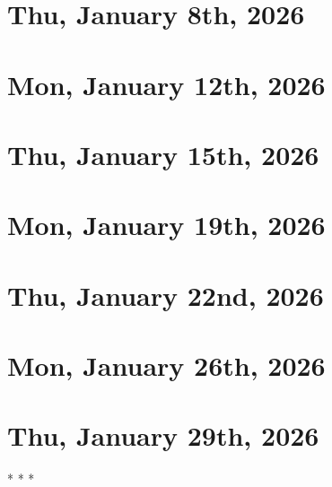 \documentclass[a4paper]{report}
\begin{document}
\chapter{Thu, January 8th, 2026}


\chapter{Mon, January 12th, 2026}


\chapter{Thu, January 15th, 2026}


\chapter{Mon, January 19th, 2026}


\chapter{Thu, January 22nd, 2026}


\chapter{Mon, January 26th, 2026}


\chapter{Thu, January 29th, 2026}


%

\centering
* * *
%
\end{document}
